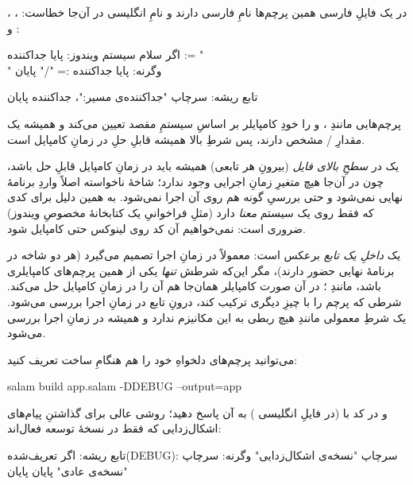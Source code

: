 در یک فایلِ فارسی همین پرچم‌ها نامِ فارسی دارند و نامِ انگلیسی در آن‌جا خطاست:
، ،  و
:

\begin{salamfa}
اگر سلام سیستم ویندوز:
    پایا جداکننده := "\\"
وگرنه:
    پایا جداکننده := "/"
پایان

تابع ریشه:
    سرچاپ "جداکننده‌ی مسیر:"، جداکننده
پایان
\end{salamfa}

پرچم‌هایی مانندِ ،  و
 را خودِ کامپایلر بر اساسِ سیستمِ مقصد تعیین می‌کند و
همیشه یک مقدارِ / مشخص دارند، پس شرطِ بالا همیشه قابلِ
حلِ در زمانِ کامپایل است.

\begin{deep}
یک  در \emph{سطحِ بالای فایل} (بیرونِ هر تابعی) همیشه باید در زمانِ
کامپایل قابلِ حل باشد، چون در آن‌جا هیچ متغیرِ زمانِ اجرایی وجود ندارد؛
شاخهٔ ناخواسته اصلاً واردِ برنامهٔ نهایی نمی‌شود و حتی بررسیِ گونه هم روی آن
اجرا نمی‌شود. به همین دلیل برای کدی که فقط روی یک سیستم \emph{معنا} دارد
(مثلِ فراخوانیِ یک کتابخانهٔ مخصوصِ ویندوز) ضروری است: نمی‌خواهیم آن کد روی
لینوکس حتی کامپایل شود.

یک  \emph{داخلِ یک تابع} برعکس است: معمولاً در زمانِ اجرا تصمیم
می‌گیرد (هر دو شاخه در برنامهٔ نهایی حضور دارند)، مگر این‌که شرطش \emph{تنها} یکی
از همین پرچم‌های کامپایلری باشد، مانندِ ؛ در آن
صورت کامپایلر همان‌جا هم آن را در زمانِ کامپایل حل می‌کند. شرطی که پرچم را با
چیزِ دیگری ترکیب کند، درونِ تابع در زمانِ اجرا بررسی می‌شود. یک شرطِ
معمولی مانندِ  هیچ ربطی به این مکانیزم ندارد و همیشه در
زمانِ اجرا بررسی می‌شود.
\end{deep}

می‌توانید پرچم‌های دلخواهِ خود را هم هنگامِ ساخت تعریف کنید:

\begin{salamen}[language={}]
salam build app.salam -DDEBUG --output=app
\end{salamen}

و در کد با  (در فایلِ انگلیسی )
به آن پاسخ دهید؛ روشی عالی برای گذاشتنِ پیام‌های اشکال‌زدایی که فقط در نسخهٔ
توسعه فعال‌اند:

\begin{salamfa}
تابع ریشه:
    اگر تعریف‌شده(DEBUG):
        سرچاپ "نسخه‌ی اشکال‌زدایی"
    وگرنه:
        سرچاپ "نسخه‌ی عادی"
    پایان
پایان
\end{salamfa}

